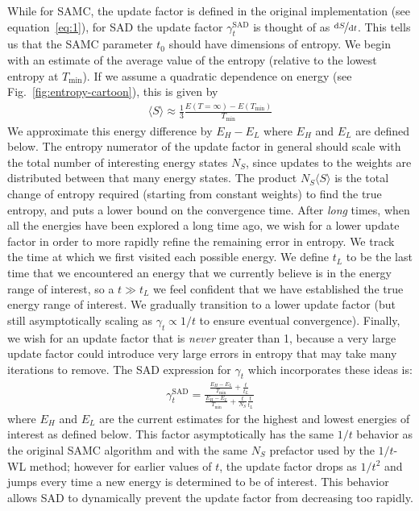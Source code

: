 \documentclass[letterpaper,twocolumn,amsmath,amssymb,pre,aps,10pt]{revtex4-1}
\begin{document}
While for SAMC, the update factor is defined in the original
implementation (see equation~\eqref{eq:1}), for SAD the update factor $\gamma_{t}^{\text{SAD}}$ is
thought of as $\nicefrac{\text{d}S}{\text{d}t}$. This tells us that
the SAMC parameter
$t_0$ should have dimensions of entropy.
We begin with an estimate of the average value of the entropy (relative
to the lowest entropy at $T_{\min}$).  If we assume a quadratic
dependence on energy (see Fig.~\ref{fig:entropy-cartoon}), this is given by
\begin{align}
\langle S\rangle \approx \frac13 \frac{E({T=\infty}) - E(T_{\min})}{T_{\min}}
\end{align}
We approximate this energy difference by $E_H -E_L$ where $E_H$ and
$E_L$ are defined below. The entropy numerator of the update factor in
general should scale with the total number of interesting energy states
$N_S$, since updates to the weights are distributed between that many
energy states.  The product $N_S\langle S\rangle$ is the total change
of entropy required (starting from constant weights) to find the true
entropy, and puts a lower bound on the convergence time. After
\emph{long} times, when all the energies have been explored a long time ago, we
wish for a lower update factor in order to more rapidly refine the
remaining error in entropy.  We track the time at which we first visited
each possible energy.  We define $t_L$ to be the last time that we
encountered an energy that we currently believe is in the energy range
of interest, so a $t\gg t_L$ we feel confident that we have established
the true energy range of interest. We gradually transition to a lower
update factor (but still asymptotically scaling as $\gamma_t \propto
1/t$ to ensure eventual convergence).  Finally, we wish for an update
factor that is \emph{never} greater than 1, because a very large update
factor could introduce very large errors in entropy that may take many iterations
to remove.  The SAD expression for $\gamma_t$ which incorporates these
ideas is:
\begin{align}
  \gamma_{t}^{\text{SAD}} =
     \frac{
       \frac{E_{H}-E_{L}}{T_{\text{min}}} + \frac{t}{t_L}
     }{
       \frac{E_{H}-E_{L}}{T_{\text{min}}} + \frac{t}{N_S}\frac{t}{t_L}
     }
\end{align}
where $E_H$ and $E_L$ are the current estimates for the highest and
lowest energies of interest as defined below.  This factor
asymptotically has the same $1/t$ behavior as the original SAMC
algorithm and with the same $N_S$ prefactor used by the $1/t$-WL
method; however for earlier values of $t$, the update factor drops as
$1/t^2$ and jumps every time a new energy is determined to be of
interest.  This behavior allows SAD to dynamically prevent the update
factor from decreasing too rapidly.
\end{document}

